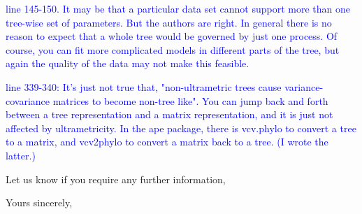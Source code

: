 \documentclass[12pt]{letter}
\begin{document}
\begin{letter}{}
\textcolor{blue}{line 145-150. It may be that a particular data set cannot support more than one tree-wise set of parameters. But the authors are right. In general there is no reason to expect that a whole tree would be governed by just one process. Of course, you can fit more complicated models in different parts of the tree, but again the quality of the data may not make this feasible.}

\textcolor{blue}{line 339-340: It's just not true that, "non-ultrametric trees cause variance-covariance matrices to become non-tree like". You can jump back and forth between a tree representation and a matrix representation, and it is just not affected by ultrametricity. In the ape package, there is vcv.phylo to convert a tree to a matrix, and vcv2phylo to convert a matrix back to a tree. (I wrote the latter.)}

Let us know if you require any further information,

\closing{Yours sincerely,}

\end{letter}
\end{document}
